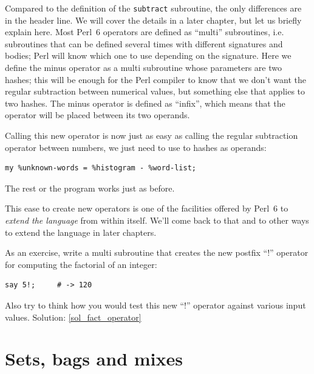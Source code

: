 
Compared to the definition of the {\tt subtract} subroutine, the 
only differences are in the header line. We will cover the 
details in a later chapter, but let us briefly explain here.
Most Perl~6 operators are defined as ``multi'' subroutines, 
i.e. subroutines that can be defined several times with 
different signatures and bodies; Perl will know which one to use depending 
on the signature. Here we define the minus operator as a 
multi subroutine whose parameters are two hashes; this will be 
enough for the Perl compiler to know that we don't want 
the regular subtraction between numerical values, but something 
else that applies to two hashes. The minus operator is defined as 
``infix'', which means that the operator will be placed 
between its two operands.

Calling this new operator is now just as easy as calling 
the regular subtraction operator between numbers, we just need 
to use to hashes as operands:

\begin{verbatim}
my %unknown-words = %histogram - %word-list;
\end{verbatim}

The rest or the program works just as before.

This ease to create new operators is one of the facilities 
offered by Perl~6 to \emph{extend the language} from within itself. 
We'll come back to that and to other ways to extend the language 
in later chapters.

\label{fact_operator}
As an exercise, write a multi subroutine that creates the new 
postfix ``!'' operator for computing the factorial of an integer:

\begin{verbatim}
say 5!;     # -> 120
\end{verbatim}
%
Also try to think how you would test this new ``!'' operator 
against various input values.
Solution: \ref{sol_fact_operator}


\section{Sets, bags and mixes}
\label{sets_and_bags}



